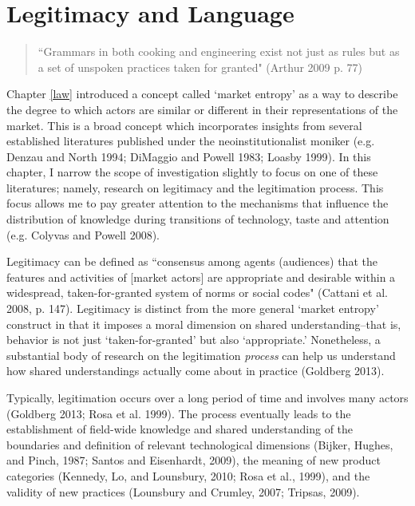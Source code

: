 \chapter{Legitimacy and Language\label{lang}}

\begin{small}
\begin{quote}
``Grammars in both cooking and engineering exist not just as rules but as a set of unspoken practices taken for granted" (Arthur 2009 p. 77)
\end{quote}
\end{small}
Chapter \ref{law} introduced a concept called `market entropy' as a way to describe the degree to which actors are similar or different in their representations of the market. This is a broad concept which incorporates insights from several established literatures published under the neoinstitutionalist moniker (e.g. Denzau and North 1994; DiMaggio and Powell 1983; Loasby 1999). In this chapter, I narrow the scope of investigation slightly to focus on one of these literatures; namely, research on legitimacy and the legitimation process. This focus allows me to pay greater attention to the mechanisms that influence the distribution of knowledge during transitions of technology, taste and attention (e.g. Colyvas and Powell 2008).

Legitimacy can be defined as ``consensus among agents (audiences) that the features and activities of [market actors] are appropriate and desirable within a widespread, taken-for-granted system of norms or social codes" (Cattani et al. 2008, p. 147). Legitimacy is distinct from the more general `market entropy' construct in that it imposes a moral dimension on shared understanding--that is, behavior is not just `taken-for-granted' but also `appropriate.' Nonetheless, a substantial body of research on the legitimation \emph{process} can help us understand how shared understandings actually come about in practice (Goldberg 2013).

Typically, legitimation occurs over a long period of time and involves many actors (Goldberg 2013; Rosa et al. 1999). The process eventually leads to the establishment of field-wide knowledge and shared understanding of the boundaries and definition of relevant technological dimensions (Bijker, Hughes, and Pinch, 1987; Santos and Eisenhardt, 2009), the meaning of new product categories (Kennedy, Lo, and Lounsbury, 2010; Rosa et al., 1999), and the validity of new practices (Lounsbury and Crumley, 2007; Tripsas, 2009). 

